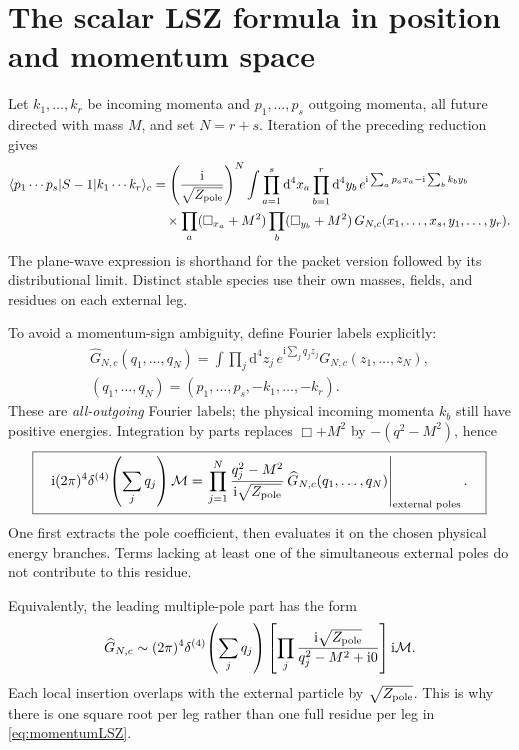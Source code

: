 \documentclass[11pt]{article}
\newcommand{\dd}{\mathrm d}
\newcommand{\ii}{\mathrm i}
\newcommand{\module}[1]{\clearpage\section{#1}}
\newcommand{\cM}{\mathcal M}
\newcommand{\Zp}{Z_{\rm pole}}
\begin{document}
\module{The scalar LSZ formula in position and momentum space}
Let \(k_1,\ldots,k_r\) be incoming momenta and \(p_1,\ldots,p_s\) outgoing
momenta, all future directed with mass \(M\), and set \(N=r+s\).
Iteration of the preceding reduction gives
\begin{align}
 \langle p_1\cdots p_s|S-1|k_1\cdots k_r\rangle_c
 &=\left(\frac{\ii}{\sqrt{\Zp}}\right)^N
 \int\prod_{a=1}^s\dd^4x_a\prod_{b=1}^r\dd^4y_b\,
 e^{\ii\sum_a p_a x_a-\ii\sum_b k_b y_b}\notag\\
 &\quad\times\prod_a(\Box_{x_a}+M^2)
 \prod_b(\Box_{y_b}+M^2)\,
 G_{N,c}(x_1,\ldots,x_s,y_1,\ldots,y_r).
 \label{eq:positionLSZ}
\end{align}
The plane-wave expression is shorthand for the packet version followed by
its distributional limit. Distinct stable species use their own masses,
fields, and residues on each external leg.

To avoid a momentum-sign ambiguity, define Fourier labels explicitly:
\begin{equation}
 \begin{gathered}
 \widehat G_{N,c}(q_1,\ldots,q_N)
 =\int\prod_j\dd^4z_j\,e^{\ii\sum_j q_j z_j}G_{N,c}(z_1,\ldots,z_N),\\
 (q_1,\ldots,q_N)=(p_1,\ldots,p_s,-k_1,\ldots,-k_r).
 \end{gathered}
\end{equation}
These are \emph{all-outgoing} Fourier labels; the physical incoming
momenta \(k_b\) still have positive energies. Integration by parts replaces
\(\Box+M^2\) by \(-(q^2-M^2)\), hence
\begin{equation}
 \boxed{\quad
 \ii(2\pi)^4\delta^{(4)}\!\left(\sum_jq_j\right)\cM
 =\left.\prod_{j=1}^N\frac{q_j^2-M^2}{\ii\sqrt{\Zp}}\,
 \widehat G_{N,c}(q_1,\ldots,q_N)\right|_{\text{external poles}}.\quad}
 \label{eq:momentumLSZ}
\end{equation}
One first extracts the pole coefficient, then evaluates it on the chosen
physical energy branches. Terms lacking at least one of the simultaneous
external poles do not contribute to this residue.

Equivalently, the leading multiple-pole part has the form
\begin{equation}
 \widehat G_{N,c}\sim (2\pi)^4\delta^{(4)}\!\left(\sum_jq_j\right)
 \left[\prod_j\frac{\ii\sqrt{\Zp}}{q_j^2-M^2+\ii0}\right]\ii\cM.
 \label{eq:factorization}
\end{equation}
Each local insertion overlaps with the external particle by \(\sqrt{\Zp}\).
This is why there is one square root per leg rather than one full residue
per leg in \eqref{eq:momentumLSZ}.
\end{document}
